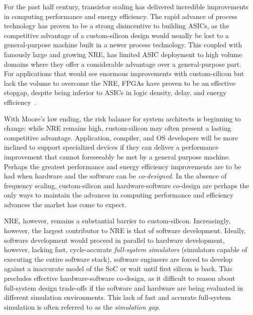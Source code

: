 For the past half century, transistor scaling has delivered incredible
improvements in computing performance and energy efficiency. The rapid advance
of process technology has proven to be a strong disincentive to building ASICs,
as the competitive advantage of a custom-silicon design would usually be lost
to a general-purpose machine built in a newer process technology. This coupled
with famously large and growing NRE, has limited ASIC deployment to high volume
domains where they offer a considerable advantage over a general-purpose part.
For applications that would see enormous improvements with custom-silicon but
lack the volume to overcome the NRE, FPGAs have proven to be an effective
stopgap, despite being inferior to ASICs in logic density, delay, and energy
efficiency~\cite{fpgagap}.

With Moore's law ending, the risk balance for system architects is beginning
to change: while NRE remains high, custom-silicon may often present a lasting
competitive advantage.  Application, compiler, and OS developers will be more
inclined to support specialized devices if they can deliver a performance
improvement that cannot foreseeably be met by a general purpose machine.
Perhaps the greatest performance and energy efficiency improvements are to be
had when hardware and the software can be \emph{co-designed}.  In the absence
of frequency scaling, custom-silicon and hardware-software co-design are
perhaps the only ways to maintain the advances in computing performance and
efficiency advances the market has come to expect.

NRE, however, remains a substantial barrier to custom-silicon.
Increasingly, however, the largest contributor to NRE is that of software
development.  Ideally, software development would proceed in parallel to
hardware development, however, lacking fast, cycle-accurate \emph{full-system
simulators} (simulators capable of executing the entire software stack),
software engineers are forced to develop against a inaccurate model of the SoC
or wait until first silicon is back. This precludes
effective hardware-software co-design, as it difficult to reason about
full-system design trade-offs if the software and hardware are being evaluated
in different simulation environments. This lack of fast and accurate
full-system simulation is often referred to as the \emph{simulation gap}.

